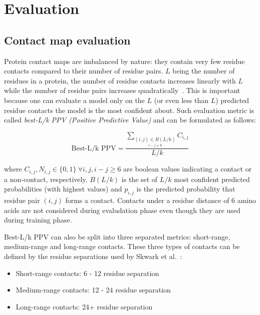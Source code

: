 \section{Evaluation}

  \subsection{Contact map evaluation}

    Protein contact maps are imbalanced by nature: they contain very few residue contacts compared to their number of residue pairs.
    $L$ being the number of residues in a protein, the number of residue contacts increases linearly with $L$ while the number of residue pairs
    increases quadratically~\cite{OLMEA1997S25}. This is important because one can evaluate a model only on the $L$ (or even less than $L$) predicted
    residue contacts the model is the most confident about. Such evaluation metric is called \textit{best-L/k PPV (Positive Predictive Value)}
    and can be formulated as follows:

    \begin{equation}
      \text{Best-L/k PPV} = \frac{\sum_{\underset {i-j \geq 6}{(i, j) \in B(L/k)}} C_{i, j}}{L/k}
    \end{equation}

    where $C_{i, j}, N_{i, j} \in \{0, 1\} \ \forall i, j, i-j \ge 6$ are boolean values indicating a contact or a non-contact, respectively.
    $B(L/k)$ is the set of $L/k$ most confident predicted probabilities (with highest values) and $p_{i, j}$ is the predicted probability
    that residue pair $(i, j)$ forms a contact.
    Contacts under a residue distance of 6 amino acids are not considered during evaludation phase even though they are used during
    training phase.

    Best-L/k PPV can also be split into three separated metrics: short-range, medium-range and long-range contacts.
    These three types of contacts can be defined by the residue separations used by Skwark et al.~\cite{10.1371/journal.pcbi.1003889}:

      \begin{itemize}
        \item Short-range contacts: 6 - 12 residue separation
        \item Medium-range contacts: 12 - 24 residue separation
        \item Long-range contacts: 24+ residue separation
      \end{itemize}

